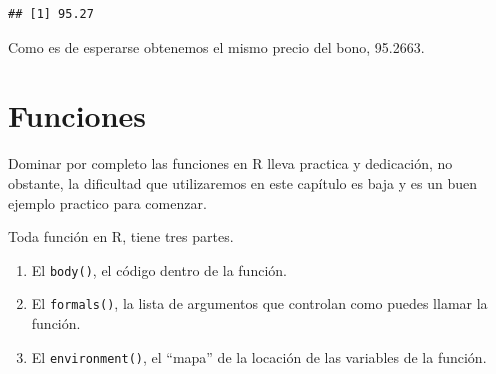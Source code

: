 \documentclass[12pt,]{book}
\newenvironment{Shaded}{\begin{snugshade}}{\end{snugshade}}
\newcommand{\KeywordTok}[1]{\textcolor[rgb]{0.13,0.29,0.53}{\textbf{#1}}}
\newcommand{\DecValTok}[1]{\textcolor[rgb]{0.00,0.00,0.81}{#1}}
\newcommand{\StringTok}[1]{\textcolor[rgb]{0.31,0.60,0.02}{#1}}
\newcommand{\CommentTok}[1]{\textcolor[rgb]{0.56,0.35,0.01}{\textit{#1}}}
\newcommand{\OperatorTok}[1]{\textcolor[rgb]{0.81,0.36,0.00}{\textbf{#1}}}
\newcommand{\NormalTok}[1]{#1}
\providecommand{\tightlist}{%
  \setlength{\itemsep}{0pt}\setlength{\parskip}{0pt}}
\begin{document}
\begin{Shaded}
\end{Shaded}

\begin{verbatim}
## [1] 95.27
\end{verbatim}

Como es de esperarse obtenemos el mismo precio del bono, 95.2663.

\section{Funciones}\label{funciones}

Dominar por completo las funciones en R lleva practica y dedicación, no
obstante, la dificultad que utilizaremos en este capítulo es baja y es
un buen ejemplo practico para comenzar.

Toda función en R, tiene tres partes.

\begin{enumerate}
\def\labelenumi{\arabic{enumi}.}
\tightlist
\item
  El \texttt{body()}, el código dentro de la función.
\item
  El \texttt{formals()}, la lista de argumentos que controlan como
  puedes llamar la función.
\item
  El \texttt{environment()}, el ``mapa'' de la locación de las variables
  de la función.
\end{enumerate}
\end{document}
